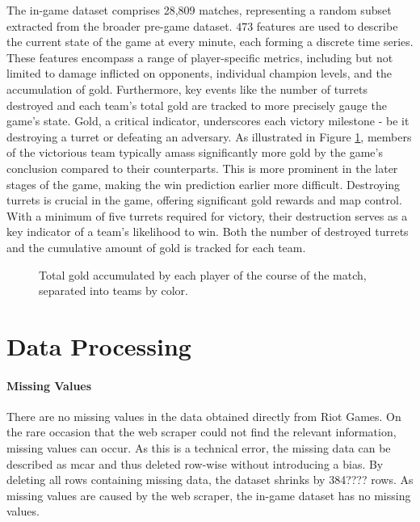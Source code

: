 \documentclass[12pt, a4paper, headinclude, twoside, plainheadsepline, open=right, numbers=noenddot, hidelinks, toc=listof, toc=bibliography]{scrreprt}
\begin{document}
The in-game dataset comprises 28,809 matches, representing a random subset extracted from the broader pre-game dataset.
$473$ features are used to describe the current state of the game at every minute, each forming a discrete time series.
These features encompass a range of player-specific metrics, including but not limited to damage inflicted on opponents, individual champion levels, and the accumulation of gold.
Furthermore, key events like the number of turrets destroyed and each team's total gold are tracked to more precisely gauge the game's state. 
Gold, a critical indicator, underscores each victory milestone - be it destroying a turret or defeating an adversary. 
As illustrated in Figure \ref{fig:totalGold}, members of the victorious team typically amass significantly more gold by the game's conclusion compared to their counterparts.
This is more prominent in the later stages of the game, making the win prediction earlier more difficult.
Destroying turrets is crucial in the game, offering significant gold rewards and map control. 
With a minimum of five turrets required for victory, their destruction serves as a key indicator of a team's likelihood to win.
Both the number of destroyed turrets and the cumulative amount of gold is tracked for each team.

\begin{figure}

\caption{Total gold accumulated by each player of the course of the match, separated into teams by color. }
\label{fig:totalGold}
\end{figure}


\section{Data Processing}
\label{sec:data_processing}

\paragraph{Missing Values}
There are no missing values in the data obtained directly from Riot Games.
On the rare occasion that the web scraper could not find the relevant information, missing values can occur.
As this is a technical error, the missing data can be described as \ac{mcar} \cite{acockWorkingMissingValues2005} and thus deleted row-wise without introducing a bias.
By deleting all rows containing missing data, the dataset shrinks by 384???? rows.
As missing values are caused by the web scraper, the in-game dataset has no missing values.
\end{document}
